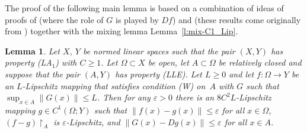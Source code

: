 \documentclass[a4paper,twoside,10pt,reqno,draft]{amsart}
\newtheorem{lemma}[theorem]{Lemma}
\theoremstyle{definition}
\theoremstyle{remark}
\newcommand\norm[1]{\mathopen\|#1\mathclose\|}
\newcommand\ve{\varepsilon}
\newcommand\Om{\Omega}
\newcommand\restr[1]{\mathclose\restriction_{#1}}
\newcommand\pLA[1]{(LA$_#1$)}
\newcommand\pLLE{(LLE)}
\newcommand\cW{(W)}
\begin{document}
The proof of the following main lemma is based on a combination of ideas of proofs of \cite[Proposition~7.94]{HJ} (where the role of $G$ is played by $Df$) and \cite[Theorem~7.86]{HJ} (these results come originally from \cite{HJ1})
together with the mixing lemma Lemma~\ref{l:mix-C1_Lip}.

\begin{lemma}\label{l:Lip-ap}
Let $X$, $Y$ be normed linear spaces such that the pair $(X,Y)$ has property \pLA1 with $C\ge1$.
Let $\Om\subset X$ be open, let $A\subset\Om$ be relatively closed and suppose that the pair $(A,Y)$ has property \pLLE.
Let $L\ge0$ and let $f\colon\Om\to Y$ be an $L$-Lipschitz mapping that satisfies condition {\cW} on~$A$ with $G$ such that $\sup_{x\in A}\norm{G(x)}\le L$.
Then for any $\ve>0$ there is an $8C^2L$-Lipschitz mapping $g\in C^1(\Om;Y)$ such that $\norm{f(x)-g(x)}\le\ve$ for all $x\in\Om$, $(f-g)\restr A$ is $\ve$-Lipschitz, and $\norm{G(x)-Dg(x)}\le\ve$ for all $x\in A$.
\end{lemma}
\end{document}
